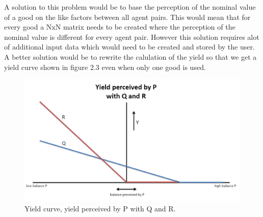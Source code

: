 \documentclass[twoside,openright]{uva-bachelor-thesis}
\begin{document}
A solution to this problem would be to base the perception of the nominal value of a good on the like factors between all agent pairs. This would mean that for every good a NxN matrix needs to be created where the perception of the nominal value is different for every agent pair. However this solution requires alot of additional input data which would need to be created and stored by the user. A better solution would be to rewrite the calulation of the yield so that we get a yield curve shown in figure 2.3 even when only one good is used. \\
\begin{figure}[h!]
 
  \centering
    \includegraphics[scale=0.4]{YieldCurves/yieldcurve_P_QR2}
 \caption{Yield curve, yield perceived by P with Q and R.}
\end{figure}
\end{document}
